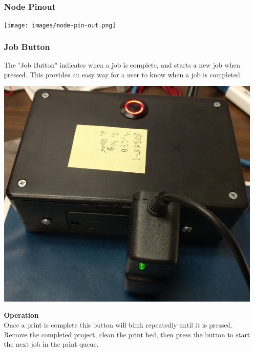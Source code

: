   \subsubsection{Node Pinout}
  \begin{center}
        \texttt{[image: images/node-pin-out.png]}
  \end{center}
    \subsubsection{Job Button}
      The "Job Button" indicates when a job is complete, and starts a new job when pressed. This provides an easy way
      for a user to know when a job is completed.
            \begin{center}
      \includegraphics[scale=0.25]{images/start-new.png}
\end{center}

      \textbf{Operation}\\
      Once a print is complete this button will blink repeatedly until it is pressed.  Remove the completed project,
      clean the print bed, then press the button to start the next job in the print queue.\\

